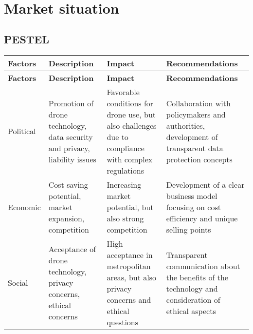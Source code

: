 \chapter{Market situation} \label{market-situation}
\section{PESTEL}
\begin{longtable}{p{} p{} p{} p{}}
  \hline
  \textbf{Factors} & \textbf{Description}                                                                                                         & \textbf{Impact}                                                                                    & \textbf{Recommendations}                                                                                          \\ \hline
  \endfirsthead %

  \hline
  \textbf{Factors} & \textbf{Description}                                                                                                         & \textbf{Impact}                                                                                    & \textbf{Recommendations}                                                                                          \\ \hline
  \endhead %

  Political        & Promotion of drone technology, data security and privacy, liability issues                                                   & Favorable conditions for drone use, but also challenges due to compliance with complex regulations & Collaboration with policymakers and authorities, development of transparent data protection concepts              \\ \hline

  Economic         & Cost saving potential, market expansion, competition                                                                         & Increasing market potential, but also strong competition                                           & Development of a clear business model focusing on cost efficiency and unique selling points                       \\ \hline

  Social           & Acceptance of drone technology, privacy concerns, ethical concerns                                                           & High acceptance in metropolitan areas, but also privacy concerns and ethical questions             & Transparent communication about the benefits of the technology and consideration of ethical aspects               \\ \hline


\end{longtable}
